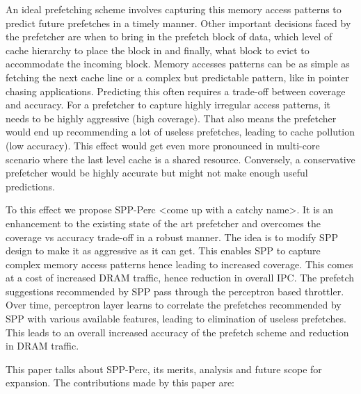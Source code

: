 \documentclass{sig-alternate}
\begin{document}
An ideal prefetching scheme involves capturing this memory access patterns to predict future prefetches in a timely manner. 
Other important decisions faced by the prefetcher are when to bring in the prefetch block of data, which level of cache hierarchy to place the block in and finally, what block to evict to accommodate the incoming block. 
Memory accesses patterns can be as simple as fetching the next cache line or a complex but predictable pattern, like in pointer chasing applications. 
Predicting this often requires a trade-off between coverage and accuracy. 
For a prefetcher to capture highly irregular access patterns, it needs to be highly aggressive (high coverage). 
That also means the prefetcher would end up recommending a lot of useless prefetches, leading to cache pollution (low accuracy). 
This effect would get even more pronounced in multi-core scenario where the last level cache is a shared resource. 
Conversely, a conservative prefetcher would be highly accurate but might not make enough useful predictions.

To this effect we propose SPP-Perc <come up with a catchy name>. 
It is an enhancement to the existing state of the art prefetcher and overcomes the coverage vs accuracy trade-off in a robust manner. 
The idea is to modify SPP design to make it as aggressive as it can get. 
This enables SPP to capture complex memory access patterns hence leading to increased coverage.
This comes at a cost of increased DRAM traffic, hence reduction in overall IPC.
The prefetch suggestions recommended by SPP pass through the perceptron based throttler. 
Over time, perceptron layer learns to correlate the prefetches recommended by SPP with various available features, leading to elimination of useless prefetches. 
This leads to an overall increased accuracy of the prefetch scheme and reduction in DRAM traffic.

\vspace{1ex}This paper talks about SPP-Perc, its merits, analysis and future scope for expansion. 
The contributions made by this paper are:
\end{document}
